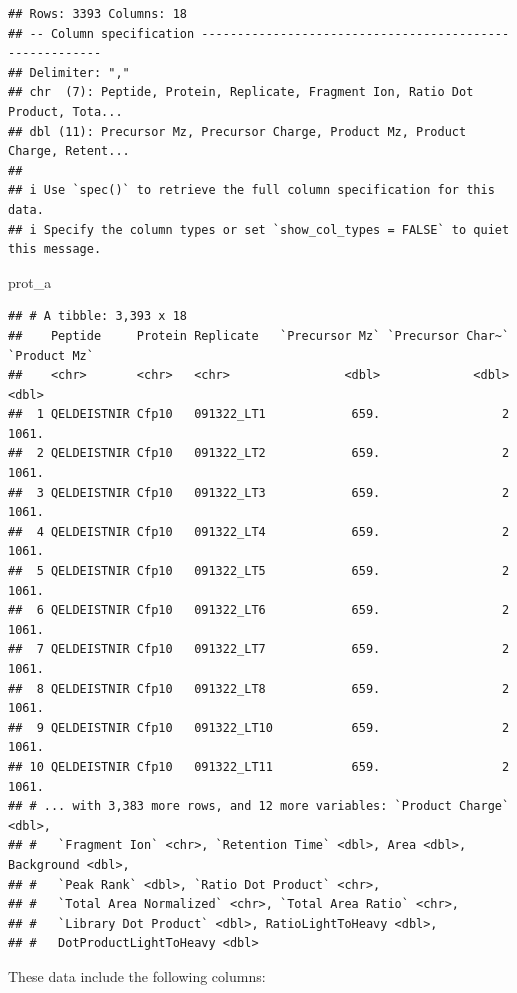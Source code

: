 \documentclass[
]{book}
\newenvironment{Shaded}{\begin{snugshade}}{\end{snugshade}}
\newcommand{\NormalTok}[1]{#1}
\begin{document}
\begin{verbatim}
## Rows: 3393 Columns: 18
## -- Column specification --------------------------------------------------------
## Delimiter: ","
## chr  (7): Peptide, Protein, Replicate, Fragment Ion, Ratio Dot Product, Tota...
## dbl (11): Precursor Mz, Precursor Charge, Product Mz, Product Charge, Retent...
## 
## i Use `spec()` to retrieve the full column specification for this data.
## i Specify the column types or set `show_col_types = FALSE` to quiet this message.
\end{verbatim}

\begin{Shaded}
\begin{Highlighting}[]
\NormalTok{prot\_a}
\end{Highlighting}
\end{Shaded}

\begin{verbatim}
## # A tibble: 3,393 x 18
##    Peptide     Protein Replicate   `Precursor Mz` `Precursor Char~` `Product Mz`
##    <chr>       <chr>   <chr>                <dbl>             <dbl>        <dbl>
##  1 QELDEISTNIR Cfp10   091322_LT1            659.                 2        1061.
##  2 QELDEISTNIR Cfp10   091322_LT2            659.                 2        1061.
##  3 QELDEISTNIR Cfp10   091322_LT3            659.                 2        1061.
##  4 QELDEISTNIR Cfp10   091322_LT4            659.                 2        1061.
##  5 QELDEISTNIR Cfp10   091322_LT5            659.                 2        1061.
##  6 QELDEISTNIR Cfp10   091322_LT6            659.                 2        1061.
##  7 QELDEISTNIR Cfp10   091322_LT7            659.                 2        1061.
##  8 QELDEISTNIR Cfp10   091322_LT8            659.                 2        1061.
##  9 QELDEISTNIR Cfp10   091322_LT10           659.                 2        1061.
## 10 QELDEISTNIR Cfp10   091322_LT11           659.                 2        1061.
## # ... with 3,383 more rows, and 12 more variables: `Product Charge` <dbl>,
## #   `Fragment Ion` <chr>, `Retention Time` <dbl>, Area <dbl>, Background <dbl>,
## #   `Peak Rank` <dbl>, `Ratio Dot Product` <chr>,
## #   `Total Area Normalized` <chr>, `Total Area Ratio` <chr>,
## #   `Library Dot Product` <dbl>, RatioLightToHeavy <dbl>,
## #   DotProductLightToHeavy <dbl>
\end{verbatim}

These data include the following columns:
\end{document}
